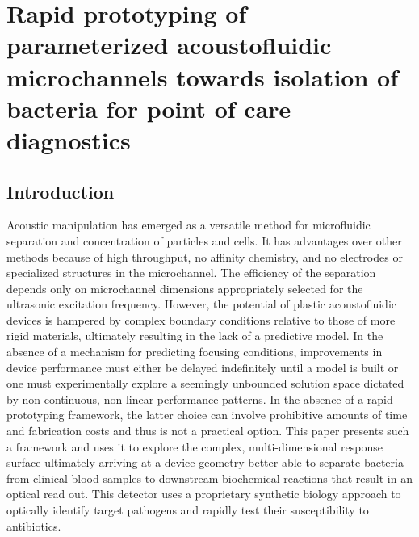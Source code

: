 \chapter{Rapid prototyping of parameterized acoustofluidic microchannels towards isolation of bacteria for point of care diagnostics}
\label{chapter:acoust}
\thispagestyle{myheadings}

\graphicspath{{4_acoust/Figures/}}

\section{Introduction}
\label{sec:acoust_intro}
Acoustic manipulation has emerged as a versatile method for microfluidic separation and concentration of particles and cells. It has advantages over other methods because of high throughput, no affinity chemistry, and no electrodes or specialized structures in the microchannel.  The efficiency of the separation depends only on microchannel dimensions appropriately selected for the ultrasonic excitation frequency. However, the potential of plastic acoustofluidic devices is hampered by complex boundary conditions relative to those of more rigid materials, ultimately resulting in the lack of a predictive model. In the absence of a mechanism for predicting focusing conditions, improvements in device performance must either be delayed indefinitely until a model is built or one must experimentally explore a seemingly unbounded solution space dictated by non-continuous, non-linear performance patterns. In the absence of a rapid prototyping framework, the latter choice can involve prohibitive amounts of time and fabrication costs and thus is not a practical option. This paper presents such a framework and uses it to explore the complex, multi-dimensional response surface ultimately arriving at a device geometry better able to separate bacteria from clinical blood samples to downstream biochemical reactions that result in an optical read out.  This detector uses a proprietary synthetic biology approach to optically identify target pathogens and rapidly test their susceptibility to antibiotics.

